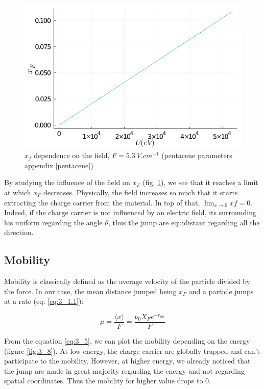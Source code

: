 \begin{figure}[!h]
    \centering
    \includegraphics*[width=.5\paperwidth]{figures/3_elec/field_xf.png}
    \caption{$x_f$ dependence on the field, $F = \SI{5.3}{V . cm^{-1}}$ (pentacene parameters appendix \ref{pentacene})\label{fig:3_7}}
\end{figure}

By studying the influence of the field on $x_F$ (fig. \ref{fig:3_7}), we see that it reaches a limit at which $x_F$ decreases. Physically, the field increases so much that it starts extracting the charge carrier from the material. In top of that, $\lim_{x\to 0} xf = 0$. Indeed, if the charge carrier is not influenced by an electric field, its surrounding his uniform regarding the angle $\theta$, thus the jump are equidistant regarding all the direction.

\subsection{Mobility}

Mobility is classically defined as the average velocity of the particle divided by the force. In our case, the mean distance jumped being $x_F$ and a particle jumps at a rate (eq. \ref{eq:3_1.1}):

\begin{equation}
    \mu = \frac{\langle x \rangle}{F} = \dfrac{\nu_0 X_F e^{-r_{nn}}}{F}
    \label{eq:3_5}
\end{equation}

From the equation \ref{eq:3_5}, we can plot the mobility depending on the energy (figure \ref{fig:3_8}). At low energy, the charge carrier are globally trapped and can't participate to the mobility. However, at higher energy, we already noticed that the jump are made in great majority regarding the energy and not regarding spatial coordinates. Thus the mobility for higher value drops to $0$.

